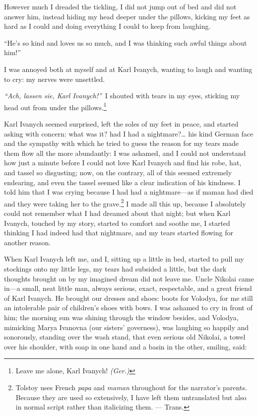 However much I dreaded the tickling, I did not jump out of bed and did not answer him, instead hiding my head deeper under the pillows, kicking my feet as hard as I could and doing everything I could to keep from laughing.

``He's so kind and loves us so much, and I was thinking such awful things about him!'' %

I was annoyed both at myself and at Karl Ivanych, wanting to laugh and wanting to cry: my nerves were unsettled.

\textit{``Ach, lassen sie, Karl Ivanych!''}~I shouted with tears in my eyes, sticking my head out from under the pillows.\footnote{Leave me alone, Karl Ivanych! \textit{(Ger.)}} %

Karl Ivanych seemed surprised, left the soles of my feet in peace, and started asking with concern: what was it? had I had a nightmare?\ldots{} his kind German face and the sympathy with which he tried to guess the reason for my tears made them flow all the more abundantly: I was ashamed, and I could not understand how just a minute before I could not love Karl Ivanych and find his robe, hat, and tassel so disgusting; now, on the contrary, all of this seemed extremely endearing, and even the tassel seemed like a clear indication of his kindness. I told him that I was crying because I had had a nightmare---as if maman had died and they were taking her to the grave.\footnote{Tolstoy uses French \textit{papa} and \textit{maman} throughout for the narrator's parents. Because they are used so extensively, I have left them untranslated but also in normal script rather than italicizing them. --- Trans.} I made all this up, because I absolutely could not remember what I had dreamed about that night; but when Karl Ivanych, touched by my story, started to comfort and soothe me, I started thinking I had indeed had that nightmare, and my tears started flowing for another reason. 

When Karl Ivanych left me, and I, sitting up a little in bed, started to pull my stockings  onto my little legs, my tears had subsided a little, but the dark thoughts brought on by my imagined dream did not leave me. Uncle  Nikolai came in---a small, neat little man, always serious, exact, respectable,  and a great friend of Karl Ivanych. He brought our dresses and shoes: boots for Volodya, for me still an intolerable pair of children's shoes with bows.  I was ashamed to cry in front of him; the morning sun was shining through the window besides, and Volodya, mimicking Marya Ivanovna (our sisters' governess), was laughing so happily and sonorously, standing over the wash stand, that even serious old Nikolai, a towel over his shoulder, with soap in one hand and a basin in the other, smiling, said:

